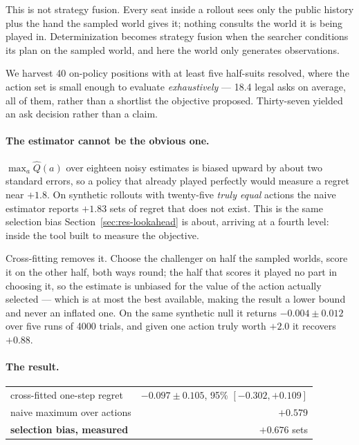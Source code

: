 \documentclass[11pt,a4paper]{article}
\begin{document}
This is not strategy fusion. Every seat inside a rollout sees only the public
history plus the hand the sampled world gives it; nothing consults the world it
is being played in. Determinization becomes strategy fusion when the searcher
conditions its plan on the sampled world, and here the world only generates
observations.

We harvest 40 on-policy positions with at least five half-suits resolved, where
the action set is small enough to evaluate \emph{exhaustively} --- 18.4 legal
asks on average, all of them, rather than a shortlist the objective proposed.
Thirty-seven yielded an ask decision rather than a claim.

\paragraph{The estimator cannot be the obvious one.} $\max_a \widehat{Q}(a)$ over
eighteen noisy estimates is biased upward by about two standard errors, so a
policy that already played perfectly would measure a regret near $+1.8$. On
synthetic rollouts with twenty-five \emph{truly equal} actions the naive
estimator reports $+1.83$ sets of regret that does not exist. This is the same
selection bias Section~\ref{sec:res-lookahead} is about, arriving at a fourth
level: inside the tool built to measure the objective.

Cross-fitting removes it. Choose the challenger on half the sampled worlds,
score it on the other half, both ways round; the half that scores it played no
part in choosing it, so the estimate is unbiased for the value of the action
actually selected --- which is at most the best available, making the result a
lower bound and never an inflated one. On the same synthetic null it returns
$-0.004 \pm 0.012$ over five runs of 4000 trials, and given one action truly
worth $+2.0$ it recovers $+0.88$.

\paragraph{The result.}

\begin{center}
\small
\begin{tabular}{lr}
\toprule
cross-fitted one-step regret & $-0.097 \pm 0.105$, 95\% $[-0.302, +0.109]$ \\
naive maximum over actions   & $+0.579$ \\
\textbf{selection bias, measured} & $\mathbf{+0.676}$ sets \\
\bottomrule
\end{tabular}
\end{center}
\end{document}
